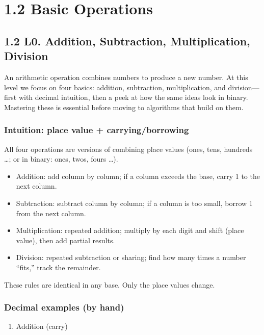 \documentclass[
  letterpaper,
  DIV=11,
  numbers=noendperiod]{scrreprt}
\providecommand{\tightlist}{%
  \setlength{\itemsep}{0pt}\setlength{\parskip}{0pt}}
\begin{document}
\section{1.2 Basic Operations}\label{basic-operations}

\subsection{1.2 L0. Addition, Subtraction, Multiplication,
Division}\label{l0.-addition-subtraction-multiplication-division}

An arithmetic operation combines numbers to produce a new number. At
this level we focus on four basics: addition, subtraction,
multiplication, and division---first with decimal intuition, then a peek
at how the same ideas look in binary. Mastering these is essential
before moving to algorithms that build on them.

\subsubsection{Intuition: place value +
carrying/borrowing}\label{intuition-place-value-carryingborrowing}

All four operations are versions of combining place values (ones, tens,
hundreds \ldots; or in binary: ones, twos, fours \ldots).

\begin{itemize}
\tightlist
\item
  Addition: add column by column; if a column exceeds the base, carry 1
  to the next column.
\item
  Subtraction: subtract column by column; if a column is too small,
  borrow 1 from the next column.
\item
  Multiplication: repeated addition; multiply by each digit and shift
  (place value), then add partial results.
\item
  Division: repeated subtraction or sharing; find how many times a
  number ``fits,'' track the remainder.
\end{itemize}

These rules are identical in any base. Only the place values change.

\subsubsection{Decimal examples (by
hand)}\label{decimal-examples-by-hand}

\begin{enumerate}
\def\labelenumi{\arabic{enumi}.}
\tightlist
\item
  Addition (carry)
\end{enumerate}
\end{document}
